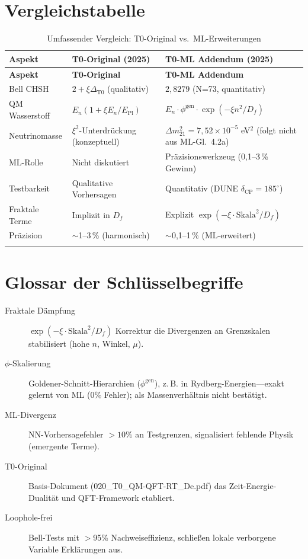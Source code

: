 	\section*{Vergleichstabelle}
	\begin{longtable}{p{2.4cm}p{4.0cm}p{4.0cm}}
		\toprule
		\textbf{Aspekt} & \textbf{T0-Original (2025)} & \textbf{T0-ML Addendum (2025)} \\
		\midrule
		\endfirsthead
		\toprule
		\textbf{Aspekt} & \textbf{T0-Original} & \textbf{T0-ML Addendum} \\
		\midrule
		\endhead
		
		Bell CHSH & $2 + \xi\Delta_{\text{T0}}$ (qualitativ) & $2{,}8279$ (N=73, quantitativ) \\
		QM Wasserstoff & $E_n(1+\xi E_n/E_{\text{Pl}})$ & $E_n \cdot \phi^{\text{gen}} \cdot \exp(-\xi n^2/D_f)$ \\
		Neutrinomasse & $\xi^2$-Unterdrückung (konzeptuell) & $\Delta m_{21}^2=7{,}52\times10^{-5}$ eV$^2$ (folgt nicht aus ML-Gl.~4.2a) \\
		ML-Rolle & Nicht diskutiert & Präzisionswerkzeug (0{,}1--3\,\% Gewinn) \\
		Testbarkeit & Qualitative Vorhersagen & Quantitativ (DUNE $\delta_{\text{CP}}=185^\circ$) \\
		Fraktale Terme & Implizit in $D_f$ & Explizit $\exp(-\xi \cdot \text{Skala}^2/D_f)$ \\
		Präzision & $\sim$1--3\,\% (harmonisch) & $\sim$0{,}1--1\,\% (ML-erweitert) \\
		\bottomrule
		\caption{Umfassender Vergleich: T0-Original vs.~ML-Erweiterungen}
	\end{longtable}
	
\section{Glossar der Schlüsselbegriffe}
	
	\begin{description}
		\item[Fraktale Dämpfung] $\exp(-\xi \cdot \text{Skala}^2/D_f)$ Korrektur die Divergenzen an Grenzskalen stabilisiert (hohe $n$, Winkel, $\mu$).
		\item[$\phi$-Skalierung] Goldener-Schnitt-Hierarchien ($\phi^{\text{gen}}$), z.\,B. in Rydberg-Energien—exakt gelernt von ML (0\% Fehler); als Massenverhältnis nicht bestätigt.
		\item[ML-Divergenz] NN-Vorhersagefehler $>10\%$ an Testgrenzen, signalisiert fehlende Physik (emergente Terme).
		\item[T0-Original] Basis-Dokument (020\_T0\_QM-QFT-RT\_De.pdf) das Zeit-Energie-Dualität und QFT-Framework etabliert.
		\item[Loophole-frei] Bell-Tests mit $>$95\% Nachweiseffizienz, schließen lokale verborgene Variable Erklärungen aus.
	\end{description}
	
